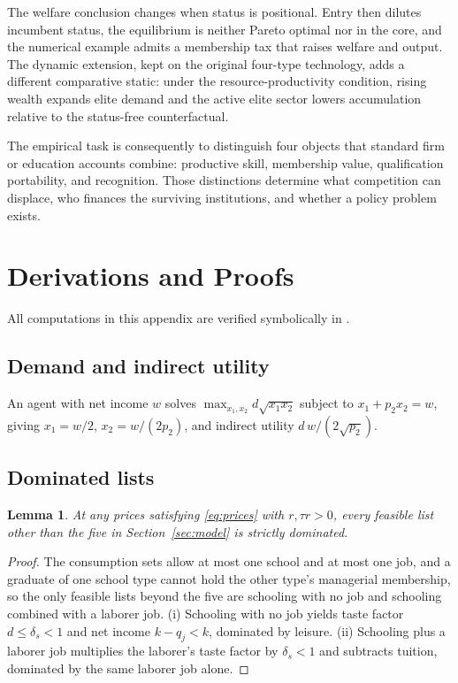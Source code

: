 \documentclass[12pt,letterpaper]{article}
\newtheorem{lemma}{Lemma}
\theoremstyle{definition}
\begin{document}
The welfare conclusion changes when status is positional.
Entry then dilutes incumbent status, the equilibrium is neither Pareto optimal nor in the
core, and the numerical example admits a membership tax that raises welfare and output.
The dynamic extension, kept on the original four-type technology, adds a different
comparative static: under the resource-productivity condition, rising wealth expands
elite demand and the active elite sector lowers accumulation relative to the status-free
counterfactual.

The empirical task is consequently to distinguish four objects that standard firm or
education accounts combine: productive skill, membership value, qualification
portability, and recognition.
Those distinctions determine what competition can displace, who finances the surviving
institutions, and whether a policy problem exists.

\appendix

\section{Derivations and Proofs}\label{app:derivations}

All computations in this appendix are verified symbolically in
.

\subsection{Demand and indirect utility}
An agent with net income $w$ solves $\max_{x_1,x_2} d\sqrt{x_1x_2}$ subject to $x_1+p_2x_2=w$, giving $x_1=w/2$, $x_2=w/(2p_2)$, and indirect utility $d\,w/(2\sqrt{p_2})$.

\subsection{Dominated lists}
\begin{lemma}\label{lem:dominated} At any prices satisfying \eqref{eq:prices} with $r,\tau r>0$, every feasible list other than the five in Section~\ref{sec:model} is strictly dominated.
\end{lemma}

\begin{proof}
The consumption sets allow at most one school and at most one job, and a graduate of one school type cannot hold the other type's managerial membership, so the only feasible lists beyond the five are schooling with no job and schooling combined with a laborer job.
(i) Schooling with no job yields taste factor $d\leq\delta_s<1$ and net income $k-q_j<k$, dominated by leisure.
(ii) Schooling plus a laborer job multiplies the laborer's taste factor by $\delta_s<1$ and subtracts tuition, dominated by the same laborer job alone.
\end{proof}
\end{document}
